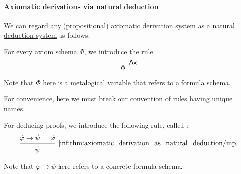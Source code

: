 \paragraph{Axiomatic derivations via natural deduction}

\begin{remark}\label{rem:axiomatic_derivation_system_as_natural_deduction_system}
  We can regard any (propositional) \hyperref[def:axiomatic_derivation_system]{axiomatic derivation system} as a \hyperref[def:propositional_natural_deduction_system]{natural deduction system} as follows:
  \begin{thmenum}
     For every axiom schema \( \Phi \), we introduce the rule
    \begin{equation*}
      \begin{prooftree}
        \infer0[\logic{Ax}]{ \Phi }
      \end{prooftree}
    \end{equation*}

    Note that \( \Phi \) here is a metalogical variable that refers to a \hyperref[def:propositional_formula_schema]{formula schema}.

    For convenience, here we must break our convention of rules having unique names.

     For deducing proofs, we introduce the following rule, called :
    \begin{equation*}\taglabel[\( \logic{MP} \)]{inf:thm:axiomatic_derivation_as_natural_deduction/mp}
      \begin{prooftree}
        \hypo{ \syn\varphi \rightarrow \syn\psi }
        \hypo{ \syn\varphi }
        \infer2[\ref{inf:thm:axiomatic_derivation_as_natural_deduction/mp}]{ \syn\psi }
      \end{prooftree}
    \end{equation*}

    Note that \( \varphi \rightarrow \psi \) here refers to a concrete formula schema.
  \end{thmenum}
\end{remark}

